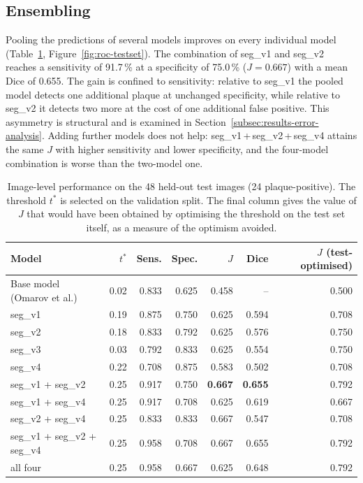 \subsection{Ensembling}
\label{subsec:results-ensembling}

Pooling the predictions of several models improves on every individual model
(Table~\ref{tab:phase2-main}, Figure~\ref{fig:roc-testset}). The combination of seg\_v1 and seg\_v2 reaches a sensitivity of
91.7\,\% at a specificity of 75.0\,\% ($J = 0.667$) with a mean Dice of 0.655. The gain is
confined to sensitivity: relative to seg\_v1 the pooled model detects one additional plaque at
unchanged specificity, while relative to seg\_v2 it detects two more at the cost of one
additional false positive. This asymmetry is structural and is examined in
Section~\ref{subsec:results-error-analysis}. Adding further models does not
help: seg\_v1\,+\,seg\_v2\,+\,seg\_v4 attains the same $J$ with higher sensitivity and lower
specificity, and the four-model combination is worse than the two-model one.

\begin{table}[H]
\centering
\caption[Phase 2 performance on the held-out test set]{Image-level performance on the 48 held-out
test images (24 plaque-positive). The threshold $t^*$ is selected on the validation split. The
final column gives the value of $J$ that would have been obtained by optimising the threshold on
the test set itself, as a measure of the optimism avoided.}
\label{tab:phase2-main}
\begin{tabular}{lrrrrrr}
\hline
Model & $t^*$ & Sens. & Spec. & $J$ & Dice & $J$ (test-optimised) \\
\hline
Base model (Omarov et al.) & 0.02 & 0.833 & 0.625 & 0.458 & -- & 0.500 \\
\hline
seg\_v1 & 0.19 & 0.875 & 0.750 & 0.625 & 0.594 & 0.708 \\
seg\_v2 & 0.18 & 0.833 & 0.792 & 0.625 & 0.576 & 0.750 \\
seg\_v3 & 0.03 & 0.792 & 0.833 & 0.625 & 0.554 & 0.750 \\
seg\_v4 & 0.22 & 0.708 & 0.875 & 0.583 & 0.502 & 0.708 \\
\hline
seg\_v1 + seg\_v2 & 0.25 & 0.917 & 0.750 & \textbf{0.667} & \textbf{0.655} & 0.792 \\
seg\_v1 + seg\_v4 & 0.25 & 0.917 & 0.708 & 0.625 & 0.619 & 0.667 \\
seg\_v2 + seg\_v4 & 0.25 & 0.833 & 0.833 & 0.667 & 0.547 & 0.708 \\
seg\_v1 + seg\_v2 + seg\_v4 & 0.25 & 0.958 & 0.708 & 0.667 & 0.655 & 0.792 \\
all four & 0.25 & 0.958 & 0.667 & 0.625 & 0.648 & 0.792 \\
\hline
\end{tabular}
\end{table}

